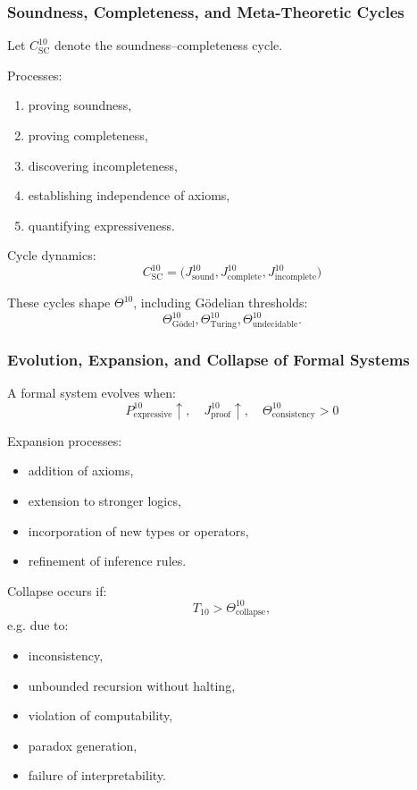 \subsubsection{Soundness, Completeness, and Meta-Theoretic Cycles}

Let $C^{10}_{\text{SC}}$ denote the soundness–completeness cycle.

Processes:
\begin{enumerate}
    \item proving soundness,
    \item proving completeness,
    \item discovering incompleteness,
    \item establishing independence of axioms,
    \item quantifying expressiveness.
\end{enumerate}

Cycle dynamics:
\[
C^{10}_{\text{SC}} =
\big( J^{10}_{\text{sound}},
      J^{10}_{\text{complete}},
      J^{10}_{\text{incomplete}} \big)
\]

These cycles shape $\Theta^{10}$, including Gödelian thresholds:
\[
\Theta^{10}_{\text{Gödel}},
\Theta^{10}_{\text{Turing}},
\Theta^{10}_{\text{undecidable}}.
\]

\subsubsection{Evolution, Expansion, and Collapse of Formal Systems}

A formal system evolves when:
\[
P^{10}_{\text{expressive}} \uparrow,
\quad
J^{10}_{\text{proof}} \uparrow,
\quad
\Theta^{10}_{\text{consistency}} > 0
\]

Expansion processes:
\begin{itemize}
    \item addition of axioms,
    \item extension to stronger logics,
    \item incorporation of new types or operators,
    \item refinement of inference rules.
\end{itemize}

Collapse occurs if:
\[
T_{10} > \Theta^{10}_{\text{collapse}},
\]
e.g. due to:
\begin{itemize}
    \item inconsistency,
    \item unbounded recursion without halting,
    \item violation of computability,
    \item paradox generation,
    \item failure of interpretability.
\end{itemize}

